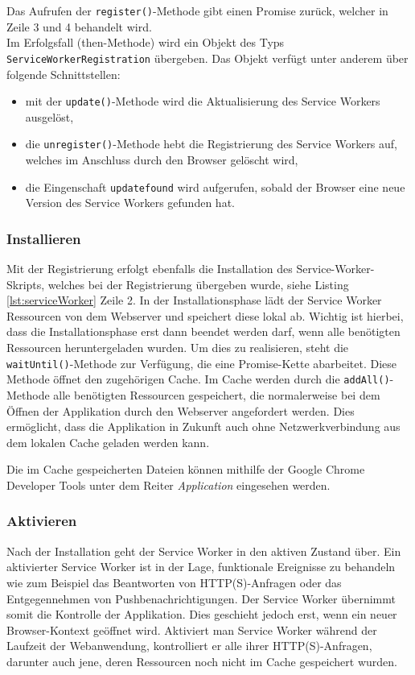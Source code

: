 Das Aufrufen der \texttt{register()}-Methode gibt einen Promise zurück, welcher in Zeile 3 und 4 behandelt wird.\\ 
Im Erfolgsfall (then-Methode) wird ein Objekt des Typs \texttt{ServiceWorkerRegistration} übergeben. Das Objekt verfügt unter anderem über folgende Schnittstellen: 
\begin{itemize}
    \item mit der \texttt{update()}-Methode wird die Aktualisierung des Service Workers ausgelöst,
    \item die \texttt{unregister()}-Methode hebt die Registrierung des Service Workers auf, welches im Anschluss durch den Browser gelöscht wird,
    \item die Eingenschaft \texttt{updatefound} wird aufgerufen, sobald der Browser eine neue Version des Service Workers gefunden hat. 
\end{itemize}

\subsubsection{Installieren}

Mit der Registrierung erfolgt ebenfalls die Installation des Service-Worker-Skripts, welches bei der Registrierung übergeben wurde, siehe Listing \ref{lst:serviceWorker} Zeile 2.
In der Installationsphase lädt der Service Worker Ressourcen von dem Webserver und speichert diese lokal ab. Wichtig ist hierbei, dass die Installationsphase erst dann beendet werden darf, wenn alle benötigten Ressourcen heruntergeladen wurden. Um dies zu realisieren, steht die \texttt{waitUntil()}-Methode zur Verfügung, die eine Promise-Kette abarbeitet. Diese Methode öffnet den zugehörigen Cache. Im Cache werden durch die \texttt{addAll()}-Methode alle benötigten Ressourcen gespeichert, die normalerweise bei dem Öffnen der Applikation durch den Webserver angefordert werden. Dies ermöglicht, dass die Applikation in Zukunft auch ohne Netzwerkverbindung aus dem lokalen Cache geladen werden kann. 



Die im Cache gespeicherten Dateien können mithilfe der Google Chrome Developer Tools unter dem Reiter \textit{Application} eingesehen werden. 

\subsubsection{Aktivieren}

Nach der Installation geht der Service Worker in den aktiven Zustand über. Ein aktivierter Service Worker ist in der Lage, funktionale Ereignisse zu behandeln wie zum Beispiel das Beantworten von HTTP(S)-Anfragen oder das Entgegennehmen von Pushbenachrichtigungen. 
Der Service Worker übernimmt somit die Kontrolle der Applikation. Dies geschieht jedoch erst, wenn ein neuer Browser-Kontext geöffnet wird. Aktiviert man Service Worker während der Laufzeit der Webanwendung, kontrolliert er alle ihrer HTTP(S)-Anfragen, darunter auch jene, deren Ressourcen noch nicht im Cache gespeichert wurden.

